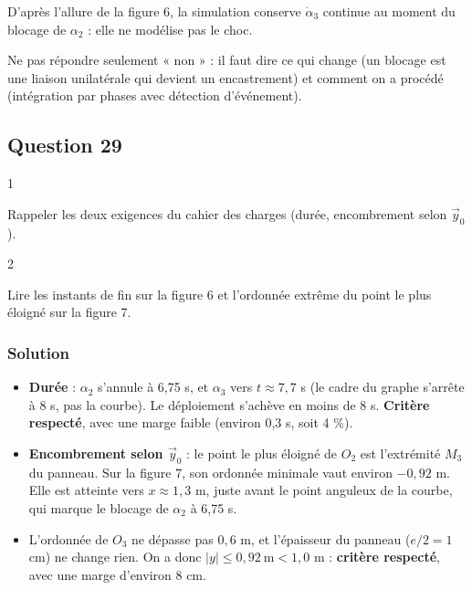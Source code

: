 \documentclass[11pt,a4paper]{article}
\providecommand{\tightlist}{\setlength{\itemsep}{0pt}\setlength{\parskip}{0pt}}
\begin{document}
D'après l'allure de la figure 6, la simulation conserve \(\dot\alpha_3\) continue au moment du blocage de \(\alpha_2\) : elle ne modélise pas le choc.

\begin{piege}

Ne pas répondre seulement « non » : il faut dire ce qui change (un blocage est une liaison unilatérale qui devient un encastrement) et comment on a procédé (intégration par phases avec détection d'événement).

\end{piege}

\hypertarget{question-29}{%
\subsection{Question 29}\label{question-29}}

\begin{indication}{1}

Rappeler les deux exigences du cahier des charges (durée, encombrement selon \(\vec y_0\)).

\end{indication}

\begin{indication}{2}

Lire les instants de fin sur la figure 6 et l'ordonnée extrême du point le plus éloigné sur la figure 7.

\end{indication}

\hypertarget{solution-28}{%
\subsubsection{Solution}\label{solution-28}}

\begin{itemize}
\tightlist
\item
  \textbf{Durée} : \(\alpha_2\) s'annule à 6,75 s, et \(\alpha_3\) vers \(t\approx7{,}7\) s (le cadre du graphe s'arrête à 8 s, pas la courbe). Le déploiement s'achève en moins de 8 s. \textbf{Critère respecté}, avec une marge faible (environ 0,3 s, soit 4 \%).
\item
  \textbf{Encombrement selon \(\vec y_0\)} : le point le plus éloigné de \(O_2\) est l'extrémité \(M_3\) du panneau. Sur la figure 7, son ordonnée minimale vaut environ \(-0{,}92\) m. Elle est atteinte vers \(x\approx1{,}3\) m, juste avant le point anguleux de la courbe, qui marque le blocage de \(\alpha_2\) à 6,75 s.
\item
  L'ordonnée de \(O_3\) ne dépasse pas \(0{,}6\) m, et l'épaisseur du panneau (\(e/2=1\) cm) ne change rien. On a donc \(|y|\le0{,}92\ \mathrm m<1{,}0\) m : \textbf{critère respecté}, avec une marge d'environ 8 cm.
\end{itemize}
\end{document}
